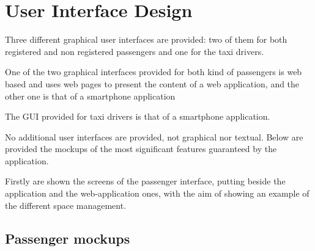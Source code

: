 \section{User Interface Design}
Three different graphical user interfaces are provided: two of them for both registered and non registered passengers and one for the taxi drivers.\par
One of the two graphical interfaces provided for both kind of passengers is web based and uses web pages to present the content of a web application, and the other one is that of a smartphone application\par
The GUI provided for taxi drivers is that of a smartphone application.\par
No additional user interfaces are provided, not graphical nor textual.
Below are provided the mockups of the  most significant features guaranteed by the application.\par
Firstly are shown the screens of the passenger interface, putting beside the application and the web-application ones, with the aim of showing an example of the different space management. \par 
\newpage
\subsection{Passenger mockups}
\begin{itemize}
\end{itemize}
\newpage
